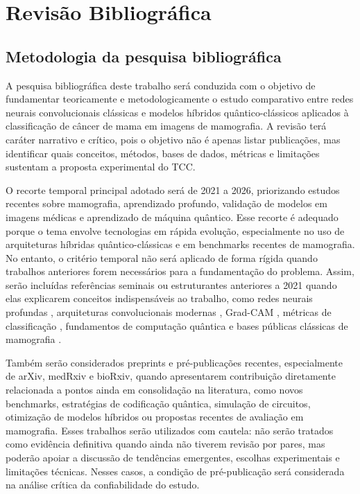 \documentclass[
    12pt,
    openright,
    oneside,
    a4paper,
    english,
    brazil
]{abntex2}
\begin{document}
\chapter{Revisão Bibliográfica}

\section{Metodologia da pesquisa bibliográfica}

A pesquisa bibliográfica deste trabalho será conduzida com o objetivo de fundamentar teoricamente e metodologicamente o estudo comparativo entre redes neurais convolucionais clássicas e modelos híbridos quântico-clássicos aplicados à classificação de câncer de mama em imagens de mamografia. A revisão terá caráter narrativo e crítico, pois o objetivo não é apenas listar publicações, mas identificar quais conceitos, métodos, bases de dados, métricas e limitações sustentam a proposta experimental do TCC.

O recorte temporal principal adotado será de 2021 a 2026, priorizando estudos recentes sobre mamografia, aprendizado profundo, validação de modelos em imagens médicas e aprendizado de máquina quântico. Esse recorte é adequado porque o tema envolve tecnologias em rápida evolução, especialmente no uso de arquiteturas híbridas quântico-clássicas e em benchmarks recentes de mamografia. No entanto, o critério temporal não será aplicado de forma rígida quando trabalhos anteriores forem necessários para a fundamentação do problema. Assim, serão incluídas referências seminais ou estruturantes anteriores a 2021 quando elas explicarem conceitos indispensáveis ao trabalho, como redes neurais profundas \cite{LeCun2015,goodfellow2016deep}, arquiteturas convolucionais modernas \cite{he2016resnet}, Grad-CAM \cite{selvaraju2020gradcam}, métricas de classificação \cite{fawcett2006roc,hand2001simple}, fundamentos de computação quântica \cite{nielsen2010quantum,preskill2018nisq} e bases públicas clássicas de mamografia \cite{moreira2012inbreast,lee2017cbisddsm}.

Também serão considerados preprints e pré-publicações recentes, especialmente de arXiv, medRxiv e bioRxiv, quando apresentarem contribuição diretamente relacionada a pontos ainda em consolidação na literatura, como novos benchmarks, estratégias de codificação quântica, simulação de circuitos, otimização de modelos híbridos ou propostas recentes de avaliação em mamografia. Esses trabalhos serão utilizados com cautela: não serão tratados como evidência definitiva quando ainda não tiverem revisão por pares, mas poderão apoiar a discussão de tendências emergentes, escolhas experimentais e limitações técnicas. Nesses casos, a condição de pré-publicação será considerada na análise crítica da confiabilidade do estudo.
\end{document}
